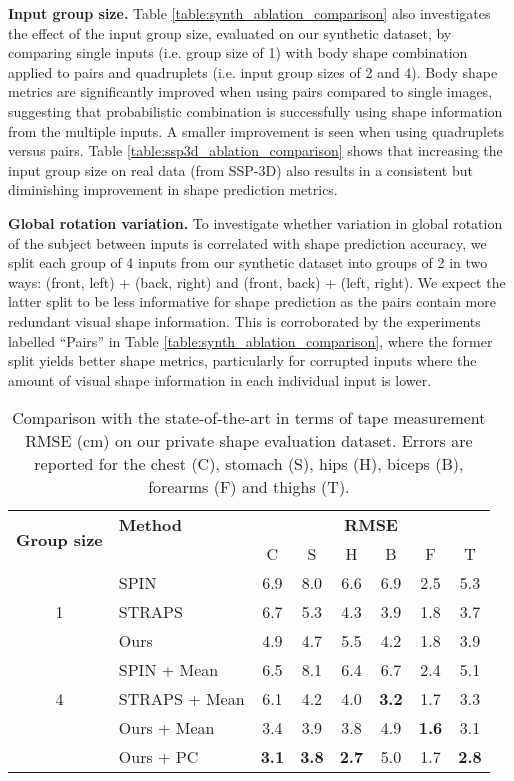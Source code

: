\documentclass[final]{cvpr}
\begin{document}
\noindent \textbf{Input group size.} Table \ref{table:synth_ablation_comparison} also investigates the effect of the input group size, evaluated on our synthetic dataset, by comparing single inputs (i.e. group size of 1) with body shape combination applied to pairs and quadruplets (i.e. input group sizes of 2 and 4). Body shape metrics are significantly improved when using pairs compared to single images, suggesting that probabilistic combination is successfully using shape information from the multiple inputs. A smaller improvement is seen when using quadruplets versus pairs. Table \ref{table:ssp3d_ablation_comparison} shows that increasing the input group size on real data (from SSP-3D) also results in a consistent but diminishing improvement in shape prediction metrics.

\noindent \textbf{Global rotation variation.} To investigate whether variation in global rotation of the subject between inputs is correlated with shape prediction accuracy, we split each group of 4 inputs from our synthetic dataset into groups of 2 in two ways: (front, left) + (back, right) and (front, back) + (left, right). We expect the latter split to be less informative for shape prediction as the pairs contain more redundant visual shape information. This is corroborated by the experiments labelled ``Pairs'' in Table \ref{table:synth_ablation_comparison}, where the former split yields better shape metrics, particularly for corrupted inputs where the amount of visual shape information in each individual input is lower.

\begin{table}[t!]
\centering
\small
\renewcommand{\tabcolsep}{3.5pt}
\begin{tabular}{c l c c c c c c} 
 \hline
 \multirow{2}{0.12\linewidth}{\textbf{Group size}} & \textbf{Method} & \multicolumn{6}{c}{\textbf{RMSE}}\\
 & & C & S & H & B & F & T \\
 \hline
\multirow{3}{3em}{1} & SPIN \cite{kolotouros2019spin} & 6.9 & 8.0 & 6.6 & 6.9 & 2.5 & 5.3\\
 & STRAPS \cite{STRAPS2020BMVC} & 6.7 & 5.3 & 4.3 & 3.9 & 1.8 & 3.7\\
 & Ours & 4.9 & 4.7 & 5.5 & 4.2 & 1.8 & 3.9\\
 \hline
\multirow{3}{3em}{4} & SPIN \cite{kolotouros2019spin} + Mean & 6.5 & 8.1 & 6.4 & 6.7 & 2.4 & 5.1\\
 & STRAPS \cite{STRAPS2020BMVC} + Mean & 6.1 & 4.2 & 4.0 & \textbf{3.2} & 1.7 & 3.3\\
 & Ours + Mean & 3.4 & 3.9 & 3.8 & 4.9 & \textbf{1.6} & 3.1\\
 & Ours + PC & \textbf{3.1} & \textbf{3.8} & \textbf{2.7} & 5.0 & 1.7 & \textbf{2.8}\\
 \hline
\end{tabular}
\caption{Comparison with the state-of-the-art in terms of tape measurement RMSE (cm) on our private shape evaluation dataset. Errors are reported for the chest (C), stomach (S), hips (H), biceps (B), forearms (F) and thighs (T).}
\label{table:size_stream_results}
\end{table}
\end{document}
